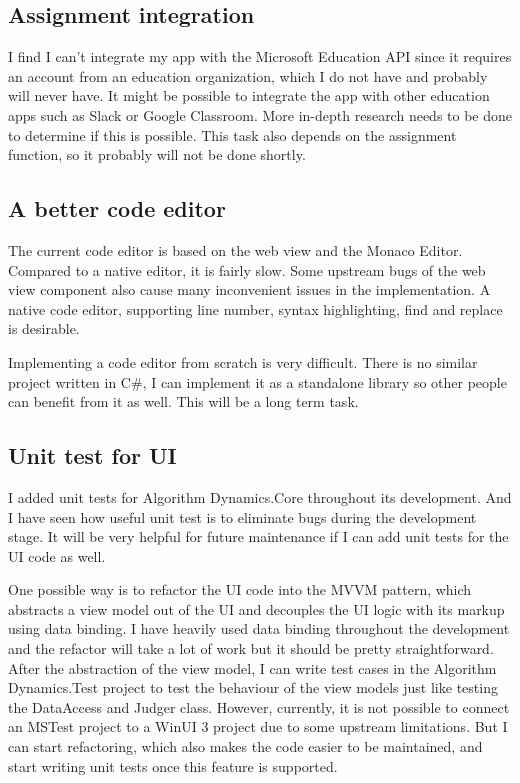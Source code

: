 \documentclass[report.tex]{subfiles}
\begin{document}
\subsection{Assignment integration}

I find I can't integrate my app with the Microsoft Education API since it requires an account from an education organization, which I do not have and probably will never have. It might be possible to integrate the app with other education apps such as Slack or Google Classroom. More in-depth research needs to be done to determine if this is possible. This task also depends on the assignment function, so it probably will not be done shortly.

\subsection{A better code editor}

The current code editor is based on the web view and the Monaco Editor. Compared to a native editor, it is fairly slow. Some upstream bugs of the web view component also cause many inconvenient issues in the implementation. A native code editor, supporting line number, syntax highlighting, find and replace is desirable.

Implementing a code editor from scratch is very difficult. There is no similar project written in C\#, I can implement it as a standalone library so other people can benefit from it as well. This will be a long term task.

\subsection{Unit test for UI}

I added unit tests for Algorithm Dynamics.Core throughout its development. And I have seen how useful unit test is to eliminate bugs during the development stage. It will be very helpful for future maintenance if I can add unit tests for the UI code as well.

One possible way is to refactor the UI code into the MVVM\cite{microsoft:docs:mvvm-introduction} pattern, which abstracts a view model out of the UI and decouples the UI logic with its markup using data binding\cite{microsoft:docs:data-binding-and-mvvm}. I have heavily used data binding throughout the development and the refactor will take a lot of work but it should be pretty straightforward. After the abstraction of the view model, I can write test cases in the Algorithm Dynamics.Test project to test the behaviour of the view models just like testing the DataAccess and Judger class. However, currently, it is not possible to connect an MSTest project to a WinUI 3 project due to some upstream limitations\cite{github:microsoft-ui-xaml:6258}. But I can start refactoring, which also makes the code easier to be maintained, and start writing unit tests once this feature is supported.
\end{document}
